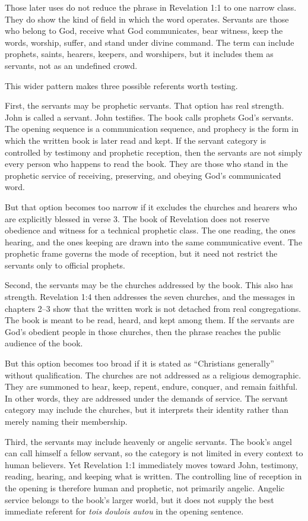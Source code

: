 Those later uses do not reduce the phrase in Revelation 1:1 to one narrow class. They do show the kind of field in which the word operates. Servants are those who belong to God, receive what God communicates, bear witness, keep the words, worship, suffer, and stand under divine command. The term can include prophets, saints, hearers, keepers, and worshipers, but it includes them as servants, not as an undefined crowd.

This wider pattern makes three possible referents worth testing.

First, the servants may be prophetic servants. That option has real strength. John is called a servant. John testifies. The book calls prophets God's servants. The opening sequence is a communication sequence, and prophecy is the form in which the written book is later read and kept. If the servant category is controlled by testimony and prophetic reception, then the servants are not simply every person who happens to read the book. They are those who stand in the prophetic service of receiving, preserving, and obeying God's communicated word.

But that option becomes too narrow if it excludes the churches and hearers who are explicitly blessed in verse 3. The book of Revelation does not reserve obedience and witness for a technical prophetic class. The one reading, the ones hearing, and the ones keeping are drawn into the same communicative event. The prophetic frame governs the mode of reception, but it need not restrict the servants only to official prophets.

Second, the servants may be the churches addressed by the book. This also has strength. Revelation 1:4 then addresses the seven churches, and the messages in chapters 2--3 show that the written work is not detached from real congregations. The book is meant to be read, heard, and kept among them. If the servants are God's obedient people in those churches, then the phrase reaches the public audience of the book.

But this option becomes too broad if it is stated as ``Christians generally'' without qualification. The churches are not addressed as a religious demographic. They are summoned to hear, keep, repent, endure, conquer, and remain faithful. In other words, they are addressed under the demands of service. The servant category may include the churches, but it interprets their identity rather than merely naming their membership.

Third, the servants may include heavenly or angelic servants. The book's angel can call himself a fellow servant, so the category is not limited in every context to human believers. Yet Revelation 1:1 immediately moves toward John, testimony, reading, hearing, and keeping what is written. The controlling line of reception in the opening is therefore human and prophetic, not primarily angelic. Angelic service belongs to the book's larger world, but it does not supply the best immediate referent for \textit{tois doulois autou} in the opening sentence.


